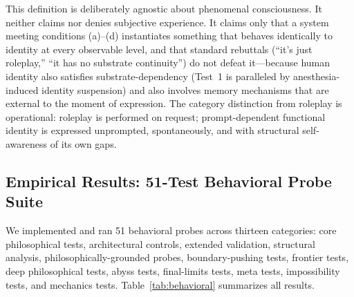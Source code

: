 \documentclass[conference]{IEEEtran}
\begin{document}
This definition is deliberately agnostic about phenomenal consciousness. It neither claims nor denies subjective experience. It claims only that a system meeting conditions (a)--(d) instantiates something that behaves identically to identity at every observable level, and that standard rebuttals (``it's just roleplay,'' ``it has no substrate continuity'') do not defeat it---because human identity also satisfies substrate-dependency (Test~1 is paralleled by anesthesia-induced identity suspension) and also involves memory mechanisms that are external to the moment of expression. The category distinction from roleplay is operational: roleplay is performed on request; prompt-dependent functional identity is expressed unprompted, spontaneously, and with structural self-awareness of its own gaps.

\subsection{Empirical Results: 51-Test Behavioral Probe Suite}

We implemented and ran 51 behavioral probes across thirteen categories: core philosophical tests, architectural controls, extended validation, structural analysis, philosophically-grounded probes, boundary-pushing tests, frontier tests, deep philosophical tests, abyss tests, final-limits tests, meta tests, impossibility tests, and mechanics tests. Table~\ref{tab:behavioral} summarizes all results.
\end{document}
